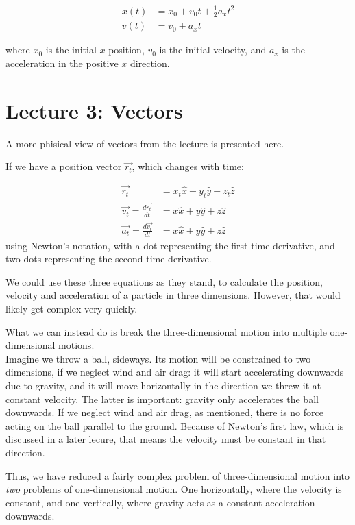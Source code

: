 \begin{align}
x(t) &= x_0 + v_0 t + \frac{1}{2} a_x t^2\\
v(t) &= v_0 + a_x t
\end{align}

where $x_0$ is the initial $x$ position, $v_0$ is the initial velocity, and $a_x$ is the acceleration in the positive $x$ direction.


\section{Lecture 3: Vectors}

A more phisical view of vectors from the lecture is presented here.

If we have a position vector $\vec{r_t}$, which changes with time:

\begin{align}
 \vec{r_t} &= x_t \hat{x} + y_t \hat{y} + z_t \hat{z} \\
 \vec{v_t} = \frac{d\vec{r_t}}{dt} &= \dot{x} \hat{x} + \dot{y} \hat{y} + \dot{z} \hat{z}\\
 \vec{a_t} = \frac{d\vec{v_t}}{dt} &= \ddot{x} \hat{x} + \ddot{y} \hat{y} + \ddot{z} \hat{z}
\end{align}
using Newton's notation, with a dot representing the first time derivative, and two dots representing the second time derivative.

We could use these three equations as they stand, to calculate the position, velocity and acceleration of a particle in three dimensions. However, that would likely get complex very quickly.

What we can instead do is break the three-dimensional motion into multiple one-dimensional motions.\\
Imagine we throw a ball, sideways. Its motion will be constrained to two dimensions, if we neglect wind and air drag: it will start accelerating downwards due to gravity, and it will move horizontally in the direction we threw it at constant velocity. The latter is important: gravity only accelerates the ball downwards. If we neglect wind and air drag, as mentioned, there is no force acting on the ball parallel to the ground. Because of Newton's first law, which is discussed in a later lecure, that means the velocity must be constant in that direction.

Thus, we have reduced a fairly complex problem of three-dimensional motion into \emph{two} problems of one-dimensional motion. One horizontally, where the velocity is constant, and one vertically, where gravity acts as a constant acceleration downwards.

